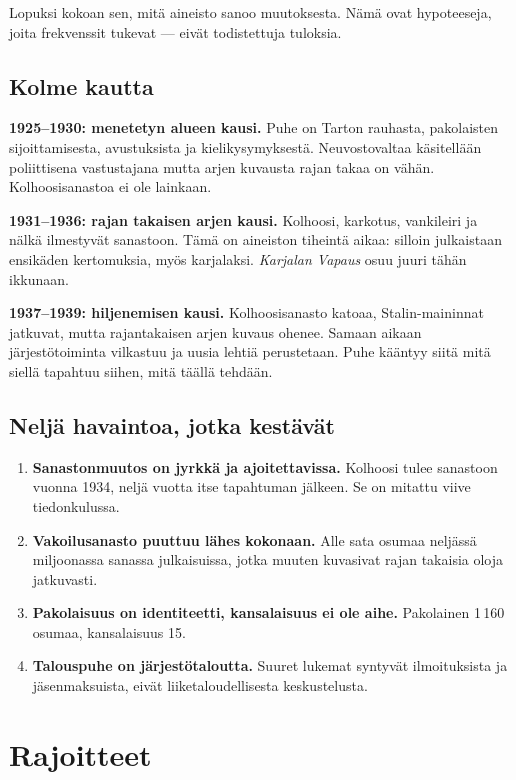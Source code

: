 \documentclass[10pt,a4paper]{article}
\begin{document}
Lopuksi kokoan sen, mitä aineisto sanoo muutoksesta. Nämä ovat hypoteeseja, joita
frekvenssit tukevat --- eivät todistettuja tuloksia.

\subsection{Kolme kautta}

\textbf{1925--1930: menetetyn alueen kausi.} Puhe on Tarton rauhasta, pakolaisten
sijoittamisesta, avustuksista ja kielikysymyksestä. Neuvostovaltaa käsitellään
poliittisena vastustajana mutta arjen kuvausta rajan takaa on vähän. Kolhoosisanastoa
ei ole lainkaan.

\textbf{1931--1936: rajan takaisen arjen kausi.} Kolhoosi, karkotus, vankileiri ja
nälkä ilmestyvät sanastoon. Tämä on aineiston tiheintä aikaa: silloin julkaistaan
ensikäden kertomuksia, myös karjalaksi. \emph{Karjalan Vapaus} osuu juuri tähän
ikkunaan.

\textbf{1937--1939: hiljenemisen kausi.} Kolhoosisanasto katoaa, Stalin-maininnat
jatkuvat, mutta rajantakaisen arjen kuvaus ohenee. Samaan aikaan järjestötoiminta
vilkastuu ja uusia lehtiä perustetaan. Puhe kääntyy siitä mitä siellä tapahtuu siihen,
mitä täällä tehdään.

\subsection{Neljä havaintoa, jotka kestävät}

\begin{enumerate}[leftmargin=1.4em,itemsep=0.35em]
\item \textbf{Sanastonmuutos on jyrkkä ja ajoitettavissa.} Kolhoosi tulee sanastoon
vuonna 1934, neljä vuotta itse tapahtuman jälkeen. Se on mitattu viive tiedonkulussa.
\item \textbf{Vakoilusanasto puuttuu lähes kokonaan.} Alle sata osumaa neljässä
miljoonassa sanassa julkaisuissa, jotka muuten kuvasivat rajan takaisia oloja
jatkuvasti.
\item \textbf{Pakolaisuus on identiteetti, kansalaisuus ei ole aihe.}
Pakolainen 1\,160 osumaa, kansalaisuus 15.
\item \textbf{Talouspuhe on järjestötaloutta.} Suuret lukemat syntyvät ilmoituksista
ja jäsenmaksuista, eivät liiketaloudellisesta keskustelusta.
\end{enumerate}

\section{Rajoitteet}
\end{document}
